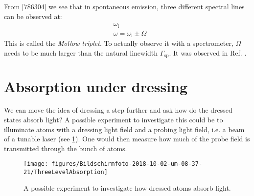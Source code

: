 \documentclass[10pt]{article}
\let\cite\citep
\providecommand\citep{\cite}
\begin{document}
From \ref{786304} we see that in spontaneous emission, three different spectral lines can be observed at:
\begin{align}
&\omega_\textrm{l}\\
&\omega=\omega_\textrm{l} \pm \Omega
\end{align}
This is called the \textit{Mollow triplet}. To actually observe it with a spectrometer, $\Omega$ needs to be much larger than the natural linewidth $\Gamma_\text{sp}$. It was observed in Ref. \cite{Grove_1977}.



\section{Absorption under dressing}

We can move the idea of dressing a step further and ask how do the dressed states absorb light? A possible experiment to investigate this could be to illuminate atoms with a dressing light field and a probing light field, i.e. a beam of a tunable laser (see \ref{118683}). One would then measure how much of the probe  field is transmitted through the bunch of atoms.
\begin{figure}[h!]
\begin{center}
\texttt{[image: figures/Bildschirmfoto-2018-10-02-um-08-37-21/ThreeLevelAbsorption]}
\caption{{A possible experiment to investigate how dressed atoms absorb light.
{\label{118683}}%
}}
\end{center}
\end{figure}
\end{document}
